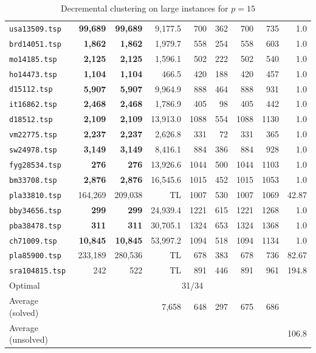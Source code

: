 \documentclass[ijoo,nonblindrev]{informs-ijoo}
\begin{document}
\begin{table}[!hbtp]
{\begin{tabular}{|l|rrrrrrrr|}
			\texttt{usa13509.tsp} & \textbf{99,689} & \textbf{99,689} & 9,177.5 & 700 & 362 & 700 & 735 & 1.0\\
			\texttt{brd14051.tsp} & \textbf{1,862} & \textbf{1,862} & 1,979.7 & 558 & 254 & 558 & 603 & 1.0\\
			\texttt{mo14185.tsp} & \textbf{2,125} & \textbf{2,125} & 1,596.1 & 502 & 222 & 502 & 540 & 1.0\\
			\texttt{ho14473.tsp} & \textbf{1,104} & \textbf{1,104} & 466.5 & 420 & 188 & 420 & 457 & 1.0\\
			\texttt{d15112.tsp} & \textbf{5,907} & \textbf{5,907} & 9,964.9 & 888 & 464 & 888 & 931 & 1.0\\
			\texttt{it16862.tsp} & \textbf{2,468} & \textbf{2,468} & 1,786.9 & 405 & 98 & 405 & 442 & 1.0\\
			\texttt{d18512.tsp} & \textbf{2,109} & \textbf{2,109} & 13,913.0 & 1088 & 554 & 1088 & 1130 & 1.0\\
			\texttt{vm22775.tsp} & \textbf{2,237} & \textbf{2,237} & 2,626.8 & 331 & 72 & 331 & 365 & 1.0\\
			\texttt{sw24978.tsp} & \textbf{3,149} & \textbf{3,149} & 8,416.1 & 884 & 386 & 884 & 928 & 1.0\\
			\texttt{fyg28534.tsp} & \textbf{276} & \textbf{276} & 13,926.6 & 1044 & 500 & 1044 & 1103 & 1.0\\
			\texttt{bm33708.tsp} & \textbf{2,876} & \textbf{2,876} & 16,545.6 & 1015 & 452 & 1015 & 1053 & 1.0\\
			\texttt{pla33810.tsp} & 164,269 & 209,038 & TL & 1007 & 530 & 1007 & 1069 & 42.87\\
			\texttt{bby34656.tsp} & \textbf{299} & \textbf{299} & 24,939.4 & 1221 & 615 & 1221 & 1268 & 1.0\\
			\texttt{pba38478.tsp} & \textbf{311} & \textbf{311} & 30,705.1 & 1324 & 653 & 1324 & 1368 & 1.0\\
			\texttt{ch71009.tsp} & \textbf{10,845} & \textbf{10,845} & 53,997.2 & 1094 & 518 & 1094 & 1134 & 1.0\\
			\texttt{pla85900.tsp} & 233,189 & 280,536 & TL & 678 & 383 & 678 & 736 & 82.67\\
			\texttt{sra104815.tsp} & 242 & 522 & TL & 891 & 446 & 891 & 961 & 194.8\\
			\hline
			Optimal &  \multicolumn{8}{|c|}{31/34}\\
			Average (solved) & & & 7,658 & 648 & 297 & 675 & 686 & \\
			Average (unsolved) & & & & & & & & 106.8\\
			\hline
	\end{tabular}}
	\caption{Decremental clustering on large instances for $p = 15$\label{table:large:p15}}
\end{table}
\end{document}
